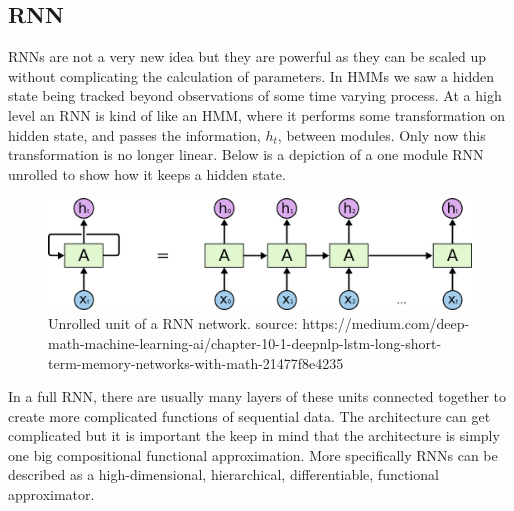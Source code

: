 \documentclass{article}
\begin{document}
\subsection{RNN}

RNNs are not a very new idea but they are powerful as they can be scaled up without complicating the calculation of parameters. In HMMs we saw a hidden state being tracked beyond observations of some time varying process. At a high level an RNN is kind of like an HMM, where it performs some transformation on hidden state, and passes the information, $h_t$, between modules. Only now this transformation is no longer linear. Below is a depiction of a one module RNN unrolled to show how it keeps a hidden state.\\

\begin{figure}
  \includegraphics[width=\linewidth]{RNN-unrolled.png}
  \caption{Unrolled unit of a RNN network.   source: https://medium.com/deep-math-machine-learning-ai/chapter-10-1-deepnlp-lstm-long-short-term-memory-networks-with-math-21477f8e4235}
  \label{fig:RNN Unrolled}
\end{figure}


In a full RNN, there are usually many layers of these units connected together to create more complicated functions of sequential data. The architecture can get complicated but it is important the keep in mind that the architecture is simply one big compositional functional approximation. More specifically RNNs can be described as a high-dimensional, hierarchical, differentiable, functional approximator.\\
\end{document}
